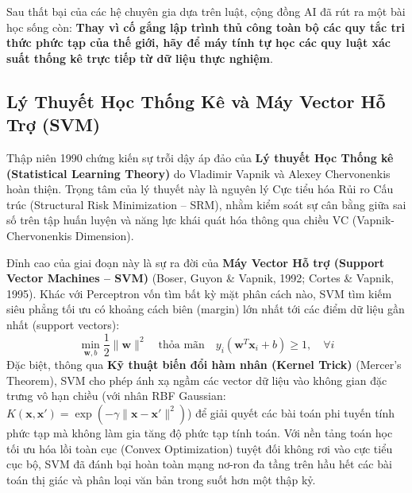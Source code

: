 \documentclass[12pt,a4paper]{report}
\begin{document}
Sau thất bại của các hệ chuyên gia dựa trên luật, cộng đồng AI đã rút ra một bài học sống còn: \textbf{Thay vì cố gắng lập trình thủ công toàn bộ các quy tắc tri thức phức tạp của thế giới, hãy để máy tính tự học các quy luật xác suất thống kê trực tiếp từ dữ liệu thực nghiệm}.

\subsection{Lý Thuyết Học Thống Kê và Máy Vector Hỗ Trợ (SVM)}
Thập niên 1990 chứng kiến sự trỗi dậy áp đảo của \textbf{Lý thuyết Học Thống kê (Statistical Learning Theory)} do Vladimir Vapnik và Alexey Chervonenkis hoàn thiện. Trọng tâm của lý thuyết này là nguyên lý Cực tiểu hóa Rủi ro Cấu trúc (Structural Risk Minimization -- SRM), nhằm kiểm soát sự cân bằng giữa sai số trên tập huấn luyện và năng lực khái quát hóa thông qua chiều VC (Vapnik-Chervonenkis Dimension).

Đỉnh cao của giai đoạn này là sự ra đời của \textbf{Máy Vector Hỗ trợ (Support Vector Machines -- SVM)} (Boser, Guyon \& Vapnik, 1992; Cortes \& Vapnik, 1995). Khác với Perceptron vốn tìm bất kỳ mặt phân cách nào, SVM tìm kiếm siêu phẳng tối ưu có khoảng cách biên (margin) lớn nhất tới các điểm dữ liệu gần nhất (support vectors):
\begin{equation}
\min_{\mathbf{w}, b} \frac{1}{2} \|\mathbf{w}\|^2 \quad \text{thỏa mãn} \quad y_i (\mathbf{w}^T \mathbf{x}_i + b) \ge 1, \quad \forall i
\end{equation}
Đặc biệt, thông qua \textbf{Kỹ thuật biến đổi hàm nhân (Kernel Trick)} (Mercer's Theorem), SVM cho phép ánh xạ ngầm các vector dữ liệu vào không gian đặc trưng vô hạn chiều (với nhân RBF Gaussian: $K(\mathbf{x}, \mathbf{x}') = \exp(-\gamma \|\mathbf{x} - \mathbf{x}'\|^2)$) để giải quyết các bài toán phi tuyến tính phức tạp mà không làm gia tăng độ phức tạp tính toán. Với nền tảng toán học tối ưu hóa lồi toàn cục (Convex Optimization) tuyệt đối không rơi vào cực tiểu cục bộ, SVM đã đánh bại hoàn toàn mạng nơ-ron đa tầng trên hầu hết các bài toán thị giác và phân loại văn bản trong suốt hơn một thập kỷ.
\end{document}
